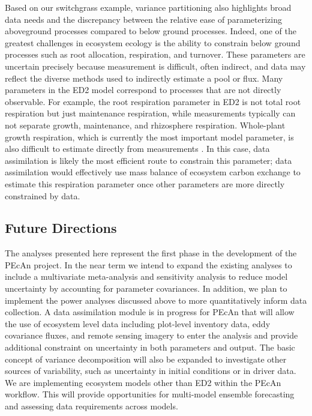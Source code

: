 \documentclass[12pt]{article}
\begin{document}
\begin{flushleft}
\begin{spacing}{1.9}
 Based on our switchgrass example, variance partitioning also highlights broad data needs and the discrepancy between the relative ease of parameterizing aboveground processes compared to below ground processes.
 Indeed, one of the greatest challenges in ecosystem ecology is the ability to constrain below ground processes such as root allocation, respiration, and turnover. 
 These parameters are uncertain precisely because measurement is difficult, often indirect, and data may reflect the diverse methods used to indirectly estimate a pool or flux.
 Many parameters in the ED2 model correspond to processes that are not directly observable. 
 For example, the root respiration parameter in ED2 is not total root respiration but just maintenance respiration, while measurements typically can not separate growth, maintenance, and rhizosphere respiration.
 Whole-plant growth respiration, which is currently the most important model parameter, is also difficult to estimate directly from measurements \citep{amthor2000mdp}. 
 In this case, data assimilation is likely the most efficient route to constrain this parameter; data assimilation would effectively use mass balance of ecosystem carbon exchange to estimate this respiration parameter once other parameters are more directly constrained by data.

\subsection*{Future Directions}

 The analyses presented here represent the first phase in the development of the PEcAn project.
 In the near term we intend to expand the existing analyses to include a multivariate meta-analysis and sensitivity analysis to reduce model uncertainty by accounting for parameter covariances.
 In addition, we plan to implement the power analyses discussed above to more quantitatively inform data collection.
 A data assimilation module is in progress for PEcAn that will allow the use of ecosystem level data including plot-level inventory data, eddy covariance fluxes, and remote sensing imagery to enter the analysis and provide additional constraint on uncertainty in both parameters and output.
 The basic concept of variance decomposition will also be expanded to investigate other sources of variability, such as uncertainty in initial conditions or in driver data.
 We are implementing ecosystem models other than ED2 within the PEcAn workflow.
 This will provide opportunities for multi-model ensemble forecasting and assessing data requirements across models.


\end{spacing}
\end{flushleft}
\end{document}
